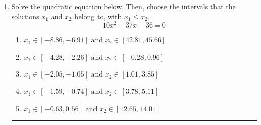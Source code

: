 \documentclass[14pt]{extbook}
\newcommand{\litem}[1]{\item#1\hspace*{-1cm}\rule{\textwidth}{0.4pt}}
\begin{document}
\begin{enumerate}
{\begin{enumerate}[label=\Alph*.]
\end{enumerate} }
\litem{
Solve the quadratic equation below. Then, choose the intervals that the solutions $x_1$ and $x_2$ belong to, with $x_1 \leq x_2$.\[ 10x^{2} -37 x -36 = 0 \]\begin{enumerate}[label=\Alph*.]
\item \( x_1 \in [-8.86, -6.91] \text{ and } x_2 \in [42.81, 45.66] \)
\item \( x_1 \in [-4.28, -2.26] \text{ and } x_2 \in [-0.28, 0.96] \)
\item \( x_1 \in [-2.05, -1.05] \text{ and } x_2 \in [1.01, 3.85] \)
\item \( x_1 \in [-1.59, -0.74] \text{ and } x_2 \in [3.78, 5.11] \)
\item \( x_1 \in [-0.63, 0.56] \text{ and } x_2 \in [12.65, 14.01] \)


\end{enumerate}}
\end{enumerate}
\end{document}
